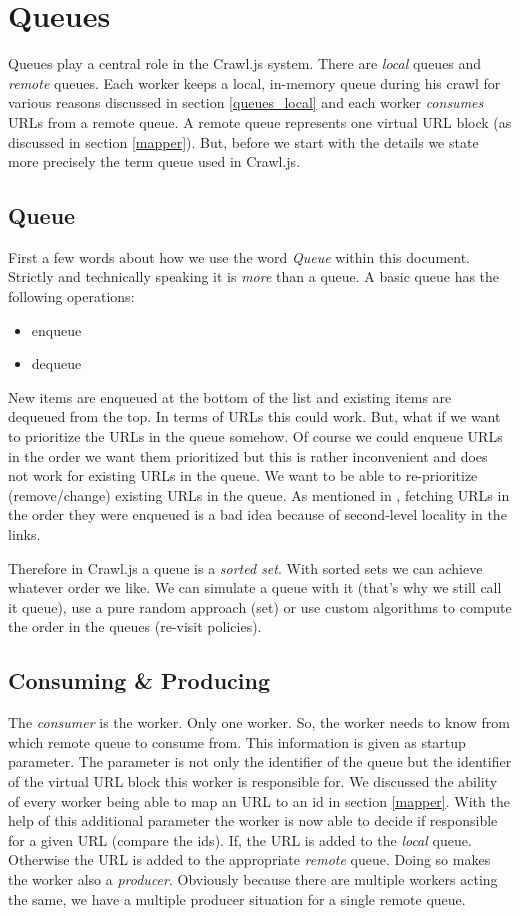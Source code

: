 \section{Queues}
Queues play a central role in the Crawl.js system. There are \emph{local} queues and \emph{remote} queues. Each worker keeps a local, in-memory queue during his crawl for various reasons discussed in section \ref{queues_local} and each worker \emph{consumes} URLs from a remote queue. A remote queue represents one virtual URL block (as discussed in section \ref{mapper}). But, before we start with the details we state more precisely the term queue used in Crawl.js.

\subsection{Queue}
First a few words about how we use the word \emph{Queue} within this document. Strictly and technically speaking it is \emph{more} than a queue. A basic queue has the following operations:
\begin{itemize}
  \item enqueue
  \item dequeue
\end{itemize}

New items are enqueued at the bottom of the list and existing items are dequeued from the top. In terms of URLs this could work. But, what if we want to prioritize the URLs in the queue somehow. Of course we could enqueue URLs in the order we want them prioritized but this is rather inconvenient and does not work for existing URLs in the queue. We want to be able to re-prioritize (remove/change) existing URLs in the queue. As mentioned in \cite{hp_crawler}, fetching URLs in the order they were enqueued is a bad idea because of second-level locality in the links.

Therefore in Crawl.js a queue is a \emph{sorted set}. With sorted sets we can achieve whatever order we like. We can simulate a queue with it (that's why we still call it queue), use a pure random approach (set) or use custom algorithms to compute the order in the queues (re-visit policies).

\subsection{Consuming \& Producing}
The \emph{consumer} is the worker. Only one worker. So, the worker needs to know from which remote queue to consume from. This information is given as startup parameter. The parameter is not only the identifier of the queue but the identifier of the virtual URL block this worker is responsible for. We discussed the ability of every worker being able to map an URL to an id in section \ref{mapper}. With the help of this additional parameter the worker is now able to decide if responsible for a given URL (compare the ids). If, the URL is added to the \emph{local} queue. Otherwise the URL is added to the appropriate \emph{remote} queue. Doing so makes the worker also a \emph{producer}. Obviously because there are multiple workers acting the same, we have a multiple producer situation for a single remote queue. 

